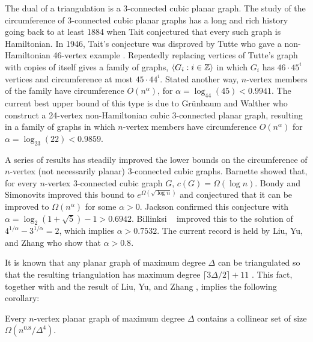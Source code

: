 \documentclass{patmorin}
\newcommand{\note}[2]{{\color{red}[#1:~#2]}}
\begin{document}
The dual of a triangulation is a 3-connected cubic planar graph.
The study of the circumference of 3-connected cubic planar graphs
has a long and rich history going back to at least 1884 when Tait
\cite{tait:remarks} conjectured that every such graph is Hamiltonian.  In
1946, Tait's conjecture was disproved by Tutte who gave a non-Hamiltonian
46-vertex example \cite{tutte:on}.  Repeatedly replacing vertices of
Tutte's graph with copies of itself gives a family of graphs, $\langle G_i:i\in
\mathbb{Z}\rangle$ in which $G_i$ has $46\cdot 45^i$ vertices and circumference at
most $45\cdot44^i$.  Stated another way, $n$-vertex members of the
family have circumference $O(n^\alpha)$, for $\alpha=\log_{44}(45) < 0.9941$.
The current best upper bound of this type is due to Gr\"unbaum and
Walther \cite{grunbaum.walther:shortness} who construct a 24-vertex
non-Hamiltonian cubic 3-connected planar graph, resulting in a family
of graphs in which $n$-vertex members have circumference $O(n^{\alpha})$
for $\alpha=\log_{23}(22)< 0.9859$.

A series of results has steadily improved the lower bounds on the
circumference of $n$-vertex  (not necessarily planar) 3-connected
cubic graphs.  Barnette \cite{barnette:trees} showed that, for
every $n$-vertex 3-connected cubic graph $G$, $c(G)=\Omega(\log n)$.
Bondy and Simonovits \cite{bondy.simonovits:longest} improved this bound
to $e^{\Omega(\sqrt{\log n})}$ and conjectured that it can be improved
to $\Omega(n^\alpha)$ for some $\alpha>0$.  Jackson \cite{jackson:longest}
confirmed this conjecture with $\alpha=\log_2(1+\sqrt{5})-1 > 0.6942$.
Billinksi \etal\ \cite{bilinksi.jackson.ea:circumference} improved
this to the solution of $4^{1/\alpha}-3^{1/\alpha}=2$, which implies
$\alpha>0.7532$.  The current record is held by Liu, Yu, and Zhang
\cite{liu.yu.zhang:circumference} who show that $\alpha>0.8$.

It is known that any planar graph of maximum degree $\Delta$ can be
triangulated so that the resulting triangulation has maximum degree
$\lceil 3\Delta/2\rceil+11$ \cite{kant.bodlaender:triangulating}. This
fact, together with  and the result of Liu, Yu, and Zhang
\cite{liu.yu.zhang:circumference}, implies the following corollary:

\begin{cor}
  Every $n$-vertex planar graph of maximum degree $\Delta$ contains a
  collinear set of size $\Omega(n^{0.8}/\Delta^4)$.
\end{cor}

\end{document}
